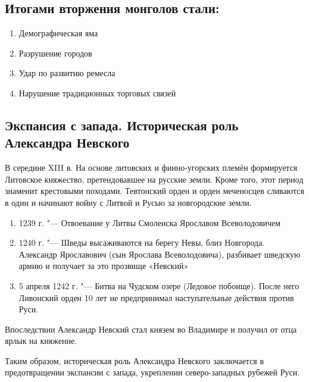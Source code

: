 \subsection{Итогами вторжения монголов стали:}
\begin{enumerate}
    \item{ Демографическая яма}
    \item{ Разрушение городов}
    \item{ Удар по развитию ремесла}
    \item{ Нарушение традиционных торговых связей}
\end{enumerate}

\subsection{Экспансия с запада. Историческая роль Александра Невского}

В середине XIII в.  На основе литовских и финно-угорских племён формируется Литовское княжество, претендовавшее на русские земли.
Кроме того, этот период знаменит крестовыми походами. Тевтонский орден и орден меченосцев сливаются в один и начинают войну с Литвой и Русью за новгородские земли.

\begin{enumerate}
    \item{ 1239 г. "--- Отвоевание у Литвы Смоленска Ярославом Всеволодовичем}
    \item{ 1240 г. "--- Шведы высаживаются на берегу Невы, близ Новгорода.  Александр Ярославович (сын Ярослава Всеволодовича), разбивает шведскую армию и получает за это прозвище «Невский»}
    \item{ 5 апреля 1242 г. "--- Битва на Чудском озере (Ледовое побоище). После него Ливонский орден 10 лет не предпринимал наступательные действия против Руси.}
\end{enumerate}

Впоследствии Александр Невский стал князем во Владимире и получил от отца ярлык на княжение.

Таким образом, историческая роль Александра Невского заключается в предотвращении экспансии с запада, укреплении северо-западных рубежей Руси.
